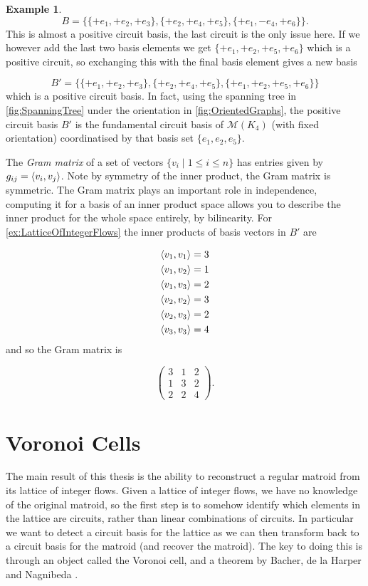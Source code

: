 \documentclass[12pt]{report}
\theoremstyle{definition}
\newtheorem{example}[theorem]{Example}
\DeclarePairedDelimiter\iprod{\langle}{\rangle}
\def\calM{\mathcal M}
\theoremstyle{upright}
\begin{document}
\begin{example}
    \[B=\{\{+e_1, +e_2, +e_3\}, \{+e_2, +e_4, +e_5\}, \{+e_1, -e_4, +e_6\}\}.\]
    This is almost a positive circuit basis, the last circuit is the only issue here.
    If we however add the last two basis elements we get $\{+e_1, +e_2, +e_5, +e_6\}$ which is a positive circuit, so exchanging this with the final basis element gives a new basis

    \[B'=\{\{+e_1, +e_2, +e_3\}, \{+e_2, +e_4, +e_5\}, \{+e_1, +e_2, +e_5, +e_6\}\}\]
    which is a positive circuit basis.
    In fact, using the spanning tree in \cref{fig:SpanningTree} under the orientation in \cref{fig:OrientedGraphs}, the positive circuit basis $B'$ is the fundamental circuit basis of $\calM(K_4)$ (with fixed orientation) coordinatised by that basis set $\{e_1, e_2, e_5\}$.
    
\end{example}

The \textit{Gram matrix} of a set of vectors $\{v_i\;|\;1\leq i\leq n\}$ has entries given by $g_{ij}=\iprod*{v_i, v_j}$.
Note by symmetry of the inner product, the Gram matrix is symmetric.
The Gram matrix plays an important role in independence, computing it for a basis of an inner product space allows you to describe the inner product for the whole space entirely, by bilinearity.
For \cref{ex:LatticeOfIntegerFlows} the inner products of basis vectors in $B'$ are

\[\begin{aligned}
    \iprod*{v_1, v_1}&=3\\
    \iprod*{v_1, v_2}&=1\\
    \iprod*{v_1, v_3}&=2\\
    \iprod*{v_2, v_2}&=3\\
    \iprod*{v_2, v_3}&=2\\
    \iprod*{v_3, v_3}&=4
\end{aligned}\]
and so the Gram matrix is

\[\begin{pmatrix}
    3 & 1 & 2\\
    1 & 3 & 2\\
    2 & 2 & 4
\end{pmatrix}.\]

\section{Voronoi Cells}
\label{sec:Voronoi}

The main result of this thesis is the ability to reconstruct a regular matroid from its lattice of integer flows.
Given a lattice of integer flows, we have no knowledge of the original matroid, so the first step is to somehow identify which elements in the lattice are circuits, rather than linear combinations of circuits.
In particular we want to detect a circuit basis for the lattice as we can then transform back to a circuit basis for the matroid (and recover the matroid).
The key to doing this is through an object called the Voronoi cell, and a theorem by Bacher, de la Harper and Nagnibeda \cite{bacher1997lattice}.
\end{document}
